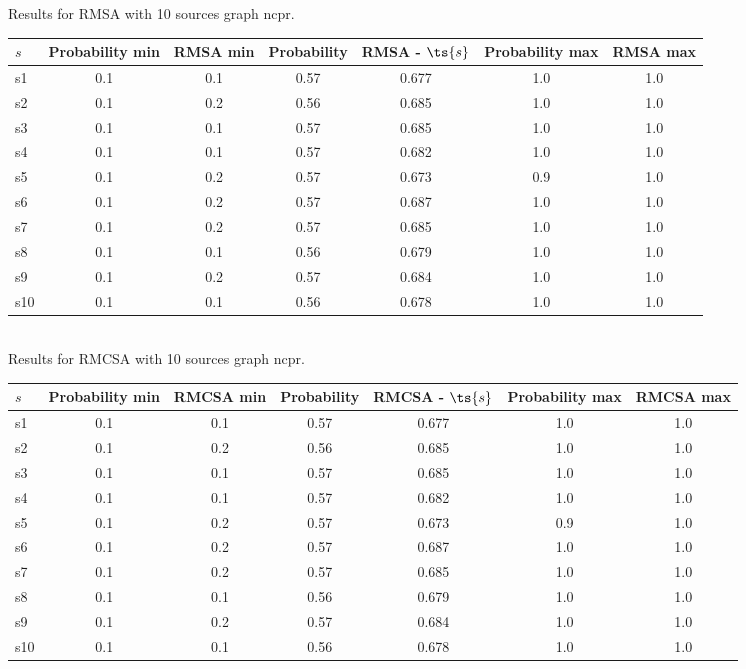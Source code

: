 \documentclass{article}
\begin{document}
\noindent Results for RMSA with 10 sources graph ncpr.

\noindent\begin{tabular}{|l|c|c|c|c|c|c|}
\hline
$s$& Probability min & RMSA min & Probability & RMSA - $\ts{s}$ & Probability max & RMSA max\\
\hline
s1 &0.1 & 0.1 & 0.57 & 0.677 & 1.0 & 1.0\\
\hline
s2 &0.1 & 0.2 & 0.56 & 0.685 & 1.0 & 1.0\\
\hline
s3 &0.1 & 0.1 & 0.57 & 0.685 & 1.0 & 1.0\\
\hline
s4 &0.1 & 0.1 & 0.57 & 0.682 & 1.0 & 1.0\\
\hline
s5 &0.1 & 0.2 & 0.57 & 0.673 & 0.9 & 1.0\\
\hline
s6 &0.1 & 0.2 & 0.57 & 0.687 & 1.0 & 1.0\\
\hline
s7 &0.1 & 0.2 & 0.57 & 0.685 & 1.0 & 1.0\\
\hline
s8 &0.1 & 0.1 & 0.56 & 0.679 & 1.0 & 1.0\\
\hline
s9 &0.1 & 0.2 & 0.57 & 0.684 & 1.0 & 1.0\\
\hline
s10 &0.1 & 0.1 & 0.56 & 0.678 & 1.0 & 1.0\\
\hline
\end{tabular}\\

\noindent Results for RMCSA with 10 sources graph ncpr.

\noindent\begin{tabular}{|l|c|c|c|c|c|c|}
\hline
$s$& Probability min & RMCSA min & Probability & RMCSA - $\ts{s}$ & Probability max & RMCSA max\\
\hline
s1 &0.1 & 0.1 & 0.57 & 0.677 & 1.0 & 1.0\\
\hline
s2 &0.1 & 0.2 & 0.56 & 0.685 & 1.0 & 1.0\\
\hline
s3 &0.1 & 0.1 & 0.57 & 0.685 & 1.0 & 1.0\\
\hline
s4 &0.1 & 0.1 & 0.57 & 0.682 & 1.0 & 1.0\\
\hline
s5 &0.1 & 0.2 & 0.57 & 0.673 & 0.9 & 1.0\\
\hline
s6 &0.1 & 0.2 & 0.57 & 0.687 & 1.0 & 1.0\\
\hline
s7 &0.1 & 0.2 & 0.57 & 0.685 & 1.0 & 1.0\\
\hline
s8 &0.1 & 0.1 & 0.56 & 0.679 & 1.0 & 1.0\\
\hline
s9 &0.1 & 0.2 & 0.57 & 0.684 & 1.0 & 1.0\\
\hline
s10 &0.1 & 0.1 & 0.56 & 0.678 & 1.0 & 1.0\\
\hline
\end{tabular}\\
\end{document}
